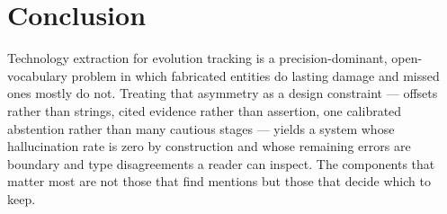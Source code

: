 \documentclass[11pt]{article}
\begin{document}
\section{Conclusion}

Technology extraction for evolution tracking is a precision-dominant,
open-vocabulary problem in which fabricated entities do lasting damage and missed
ones mostly do not. Treating that asymmetry as a design constraint --- offsets
rather than strings, cited evidence rather than assertion, one calibrated
abstention rather than many cautious stages --- yields a system whose
hallucination rate is zero by construction and whose remaining errors are
boundary and type disagreements a reader can inspect. The components that matter
most are not those that find mentions but those that decide which to keep.


\end{document}
